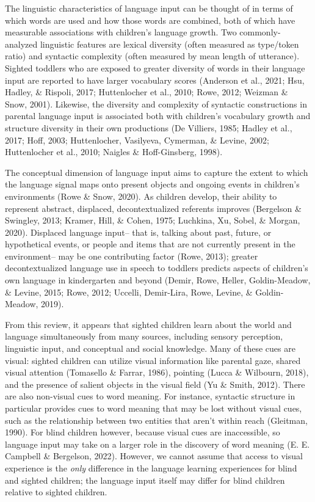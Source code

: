 \documentclass[
  man]{apa6}
\begin{document}
The linguistic characteristics of language input can be thought of in terms of which words are used and how those words are combined, both of which have measurable associations with children's language growth. Two commonly-analyzed linguistic features are lexical diversity (often measured as type/token ratio) and syntactic complexity (often measured by mean length of utterance). Sighted toddlers who are exposed to greater diversity of words in their language input are reported to have larger vocabulary scores (Anderson et al., 2021; Hsu, Hadley, \& Rispoli, 2017; Huttenlocher et al., 2010; Rowe, 2012; Weizman \& Snow, 2001). Likewise, the diversity and complexity of syntactic constructions in parental language input is associated both with children's vocabulary growth and structure diversity in their own productions (De Villiers, 1985; Hadley et al., 2017; Hoff, 2003; Huttenlocher, Vasilyeva, Cymerman, \& Levine, 2002; Huttenlocher et al., 2010; Naigles \& Hoff-Ginsberg, 1998).

The conceptual dimension of language input aims to capture the extent to which the language signal maps onto present objects and ongoing events in children's environments (Rowe \& Snow, 2020). As children develop, their ability to represent abstract, displaced, decontextualized referents improves (Bergelson \& Swingley, 2013; Kramer, Hill, \& Cohen, 1975; Luchkina, Xu, Sobel, \& Morgan, 2020). Displaced language input-- that is, talking about past, future, or hypothetical events, or people and items that are not currently present in the environment-- may be one contributing factor (Rowe, 2013); greater decontextualized language use in speech to toddlers predicts aspects of children's own language in kindergarten and beyond (Demir, Rowe, Heller, Goldin-Meadow, \& Levine, 2015; Rowe, 2012; Uccelli, Demir-Lira, Rowe, Levine, \& Goldin-Meadow, 2019).

From this review, it appears that sighted children learn about the world and language simultaneously from many sources, including sensory perception, linguistic input, and conceptual and social knowledge. Many of these cues are visual: sighted children can utilize visual information like parental gaze, shared visual attention (Tomasello \& Farrar, 1986), pointing (Lucca \& Wilbourn, 2018), and the presence of salient objects in the visual field (Yu \& Smith, 2012). There are also non-visual cues to word meaning. For instance, syntactic structure in particular provides cues to word meaning that may be lost without visual cues, such as the relationship between two entities that aren't within reach (Gleitman, 1990). For blind children however, because visual cues are inaccessible, so language input may take on a larger role in the discovery of word meaning (E. E. Campbell \& Bergelson, 2022). However, we cannot assume that access to visual experience is the \emph{only} difference in the language learning experiences for blind and sighted children; the language input itself may differ for blind children relative to sighted children.
\end{document}
